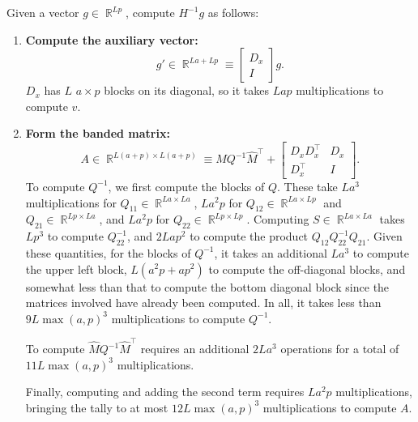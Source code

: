 \documentclass{article}
\newcommand{\R}{\mathop{\mathbb{R}}}
\begin{document}
Given a vector $g \in \R^{Lp}$, compute $H^{-1} g$ as follows:

\begin{enumerate}
  \item
    \textbf{Compute the auxiliary vector:}
    \[
      g'  \in \R^{La + Lp} \equiv
      \begin{bmatrix}
        D_x \\ I
      \end{bmatrix}
      g.
    \]
    $D_x$ has $L$ $a\times p$ blocks on its diagonal, so it takes $Lap$ multiplications to compute $v$.

  \item
    \textbf{Form the banded matrix:}
    \[
      A \in \R^{L(a+p) \times L(a+p)} \equiv \hat{M} Q^{-1} \hat{M}^\top +
      \begin{bmatrix}
        D_x D_x^\top & D_x \\ D_x^\top & I
      \end{bmatrix}
      .
    \]
    To compute $Q^{-1}$, we first compute the blocks of $Q$. These take $La^3$ multiplications for $Q_{11} \in \R^{La\times
    La}$, $La^2p$ for $Q_{12}\in \R^{L a\times Lp}$ and $Q_{21}\in \R^{Lp \times La}$, and $La^2p$ for $Q_{22}\in \R^{Lp
    \times Lp}$. Computing $S\in \R^{La\times La}$ takes $L p^3$ to compute $Q_{22}^{-1}$, and $2Lap^2$ to compute the
    product $Q_{12} Q_{22}^{-1} Q_{21}$. Given these quantities, for the blocks of $Q^{-1}$, it takes an additional $La^3$
    to compute the upper left block, $L(a^2p+ap^2)$ to compute the off-diagonal blocks, and somewhat less than that to
    compute the bottom diagonal block since the matrices involved have already been computed. In all, it takes less than
    $9L\max(a,p)^3$ multiplications to compute $Q^{-1}$.

    To compute $\hat{M}Q^{-1}\hat{M}^\top$ requires an additional $2La^3$ operations for a total of $11L\max(a,p)^3$
    multiplications.

    Finally, computing and adding the second term requires $La^2p$ multiplications, bringing the tally to at most $12 L
    \max(a,p)^3$ multiplications to compute $A$.


\end{enumerate}
\end{document}

